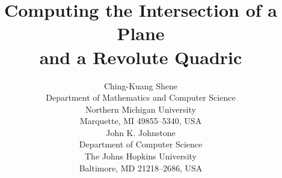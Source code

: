 %


\title{
     Computing the Intersection of a Plane \\
     and a Revolute Quadric}

\author{Ching-Kuang Shene\\
        Department of Mathematics and Computer Science \\
        Northern Michigan University \\
        Marquette, MI 49855--5340, USA\\[0.5cm]
        John K. Johnstone \\
        Department of Computer Science\\
        The Johns Hopkins University \\
        Baltimore, MD 21218--2686, USA}

\date{\ }



\newtheorem{example}{Example}[section]
\newtheorem{property}{Property}[section]
\newtheorem{definition}{Definition}[section]
\newtheorem{theorem}{Theorem}[section]
\newtheorem{lemma}{Lemma}[section]
\newtheorem{corollary}{Corollary}[section]
\newtheorem{remark}{Remark}[section]

\newcommand{\DoubleSpace}{\edef\baselinestretch{1.4}\Large\normalsize}
\newcommand{\QED}{\ \ \ \rule{2mm}{3mm}\\}
\newcommand{\arrow}[1]{\vec{\bf #1}}

\setlength{\oddsidemargin}{0pt}
\setlength{\evensidemargin}{0pt}
\setlength{\headsep}{0pt}
\setlength{\topmargin}{0pt}
\setlength{\textheight}{8.75in}
\setlength{\textwidth}{6.5in}



\maketitle


